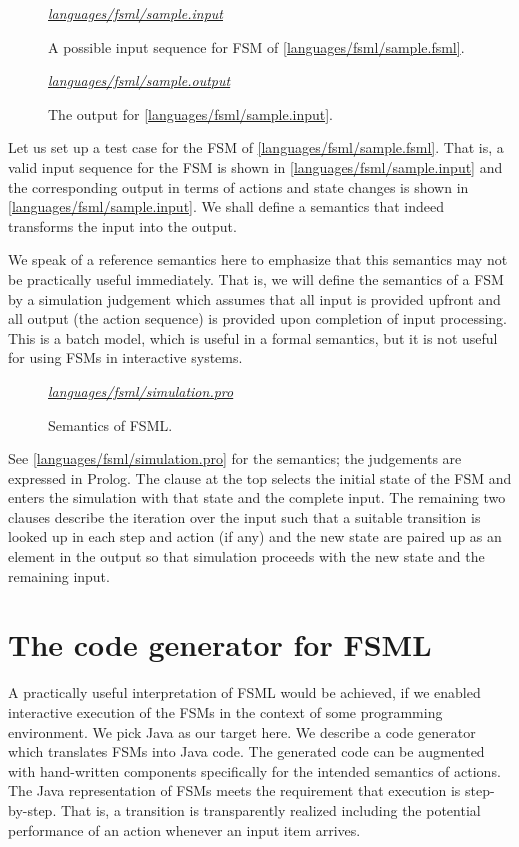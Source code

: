 \documentclass[preprint,authoryear,12pt]{noelsarticle}
\newcommand{\codefigure}[3]{
\begin{figure}[t!]
\begin{boxedminipage}{\hsize}
\mbox{}\hfill{}{\small\textit{\href{http://github.com/slebok/slepro/tree/master/#2}{#2}}}

\end{boxedminipage}
\caption{#1.}
\label{#2}
\medskip
\end{figure}}
\begin{document}
\codefigure{%
A possible input sequence for FSM of
\autoref{languages/fsml/sample.fsml}}{%
languages/fsml/sample.input}{%
prolog}

\codefigure{%
The output for 
\autoref{languages/fsml/sample.input}}{%
languages/fsml/sample.output}{%
prolog}

Let us set up a test case for the FSM of
\autoref{languages/fsml/sample.fsml}. That is, a valid input sequence
for the FSM is shown in \autoref{languages/fsml/sample.input} and the
corresponding output in terms of actions and state changes is shown in
\autoref{languages/fsml/sample.input}. We shall define a semantics
that indeed transforms the input into the output.

We speak of a reference semantics here to emphasize that this
semantics may not be practically useful immediately. That is, we
will define the semantics of a FSM by a simulation judgement which
assumes that all input is provided upfront and all output (the action
sequence) is provided upon completion of input processing. This is a
batch model, which is useful in a formal semantics, but it is not
useful for using FSMs in interactive systems.

\codefigure{%
Semantics of FSML}{%
languages/fsml/simulation.pro}{%
prolog}

See \autoref{languages/fsml/simulation.pro} for the semantics; the
judgements are expressed in Prolog. The clause at the top selects the
initial state of the FSM and enters the simulation with that state and
the complete input. The remaining two clauses describe the iteration
over the input such that a suitable transition is looked up in each
step and action (if any) and the new state are paired up as an element in
the output so that simulation proceeds with the new state and the
remaining input.


\section{The code generator for FSML}
\label{S:generator}

A practically useful interpretation of FSML would be achieved, if we
enabled interactive execution of the FSMs in the context of some
programming environment. We pick Java as our target here. We describe
a code generator which translates FSMs into Java code. The generated
code can be augmented with hand-written components specifically for
the intended semantics of actions. The Java representation of FSMs
meets the requirement that execution is step-by-step. That is, a
transition is transparently realized including the potential
performance of an action whenever an input item arrives.
\end{document}
